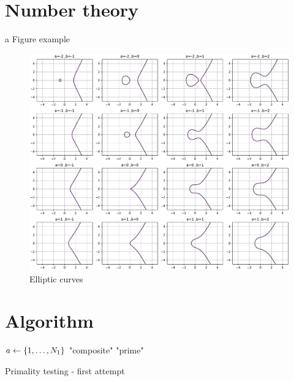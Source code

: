 \section{Number theory}
a Figure example
\begin{figure}[!ht]
    \centering
    \includegraphics[width=1\linewidth]{./figure/elliptic_curves.pdf}
    \caption{Elliptic curves \cite{childsUniversalComputationQuantum2009} }
\end{figure}


\section{Algorithm}
\begin{algorithm}[H]
    \BlankLine
     {
        $a\leftarrow \qty{1,\dots,N_1}$\;
    {\Return "composite"}
    }
    \Return "prime"
    \caption{Primality testing - first attempt}
    \label{alg:miller_rabin}
\end{algorithm}
